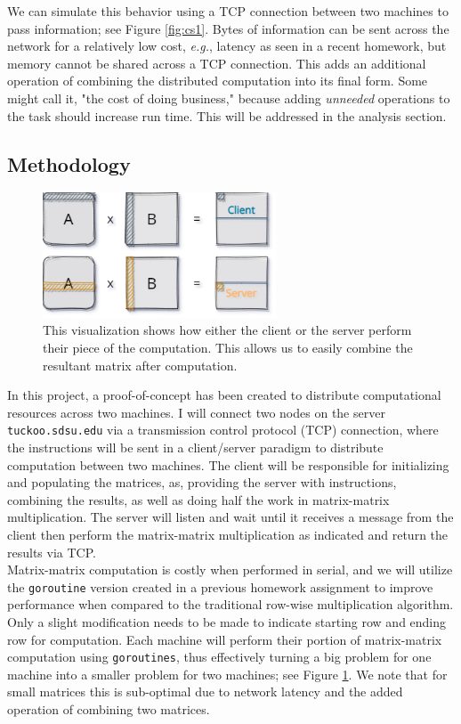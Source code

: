 \documentclass[12pt]{article}
\begin{document}
			We can simulate this behavior using a TCP connection between two machines to pass information; see Figure \ref{fig:cs1}. Bytes of information can be sent across the network for a relatively low cost, \textit{e.g.}, latency as seen in a recent homework, but memory cannot be shared across a TCP connection. This adds an additional operation of combining the distributed computation into its final form. Some might call it, "the cost of doing business," because adding \textit{unneeded} operations to the task should increase run time. This will be addressed in the analysis section.
		
		\subsection*{Methodology}
			\begin{figure}
				\centering\includegraphics[width=0.618\textwidth]{../imgs/clientserver2}
				\caption{This visualization shows how either the client or the server perform their piece of the computation. This allows us to easily combine the resultant matrix after computation.}
				\label{fig:cs2}
			\end{figure}
			In this project, a proof-of-concept has been created to distribute computational resources across two machines. I will connect two nodes on the server \texttt{tuckoo.sdsu.edu} via a transmission control protocol (TCP) connection, where the instructions will be sent in a client/server paradigm to distribute computation between two machines. The client will be responsible for initializing and populating the matrices, as, providing the server with instructions, combining the results, as well as doing half the work in matrix-matrix multiplication. The server will listen and wait until it receives a message from the client then perform the matrix-matrix multiplication as indicated and return the results via TCP.\\

			Matrix-matrix computation is costly when performed in serial, and we will utilize the \texttt{goroutine} version created in a previous homework assignment to improve performance when compared to the traditional row-wise multiplication algorithm. Only a slight modification needs to be made to indicate starting row and ending row for computation. Each machine will perform their portion of matrix-matrix computation using \texttt{goroutines}, thus effectively turning a big problem for one machine into a smaller problem for two machines; see Figure \ref{fig:cs2}. We note that for small matrices this is sub-optimal due to network latency and the added operation of combining two matrices.\\
\end{document}

